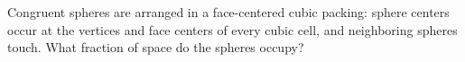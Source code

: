 Congruent spheres are arranged in a face-centered cubic packing: sphere centers occur at the vertices and face centers of every cubic cell, and neighboring spheres touch. What fraction of space do the spheres occupy?
